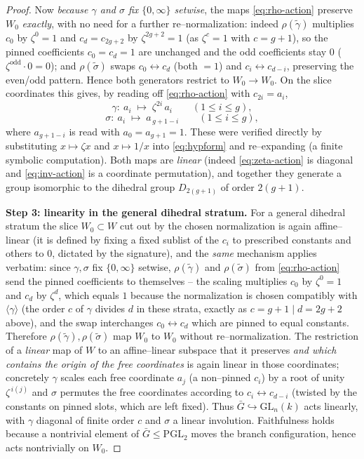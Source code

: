 \documentclass{amsart}
\theoremstyle{definition}
\begin{document}
\begin{proof}
Now \emph{because $\gamma$ and $\sigma$ fix $\{0,\infty\}$ setwise}, the maps
\eqref{eq:rho-action} preserve $W_0$ \emph{exactly}, with no need for a
further re--normalization: indeed $\rho(\widetilde\gamma)$ multiplies $c_0$ by
$\zeta^{0}=1$ and $c_{d}=c_{2g+2}$ by $\zeta^{2g+2}=1$ (as $\zeta^{c}=1$ with
$c=g+1$), so the pinned coefficients $c_0=c_{d}=1$ are unchanged and the odd
coefficients stay $0$ ($\zeta^{\text{odd}}\cdot 0=0$); and $\rho(\widetilde\sigma)$
swaps $c_0\leftrightarrow c_{d}$ (both $=1$) and $c_i\leftrightarrow c_{d-i}$,
preserving the even/odd pattern. Hence both generators restrict to
$W_0\to W_0$. On the slice coordinates this gives, by reading off \eqref{eq:rho-action} with $c_{2i}=a_i$,
\begin{equation}\label{eq:zeta-action}
 \gamma:\ a_i\;\longmapsto\;\zeta^{2i}\,a_i \qquad(1\le i\le g),
\end{equation}
\begin{equation}\label{eq:inv-action}
 \sigma:\ a_i\;\longmapsto\;a_{\,g+1-i}\qquad(1\le i\le g),
\end{equation}
where $a_{g+1-i}$ is read with $a_0=a_{g+1}=1$. These were verified directly by
substituting $x\mapsto\zeta x$ and $x\mapsto 1/x$ into \eqref{eq:hypform} and
re--expanding (a finite symbolic computation). Both maps are \emph{linear} (indeed
\eqref{eq:zeta-action} is diagonal and \eqref{eq:inv-action} is a coordinate
permutation), and together they generate a group isomorphic to the dihedral group
$D_{2(g+1)}$ of order $2(g+1)$.

\textbf{Step 3: linearity in the general dihedral stratum.}
For a general dihedral stratum the slice $W_0\subset W$ cut out by the chosen
normalization is again affine--linear (it is defined by fixing a fixed sublist of
the $c_i$ to prescribed constants and others to $0$, dictated by the signature),
and the \emph{same} mechanism applies verbatim: since $\gamma,\sigma$ fix
$\{0,\infty\}$ setwise, $\rho(\widetilde\gamma)$ and $\rho(\widetilde\sigma)$ from
\eqref{eq:rho-action} send the pinned coefficients to themselves -- the scaling
multiplies $c_0$ by $\zeta^0=1$ and $c_d$ by $\zeta^{d}$, which equals $1$ because
the normalization is chosen compatibly with $\langle\gamma\rangle$ (the order $c$
of $\gamma$ divides $d$ in these strata, exactly as $c=g+1\mid d=2g+2$ above), and
the swap interchanges $c_0\leftrightarrow c_d$ which are pinned to equal
constants. Therefore $\rho(\widetilde\gamma),\rho(\widetilde\sigma)$ map $W_0$ to
$W_0$ without re--normalization. The restriction of a \emph{linear} map of $W$ to
an affine--linear subspace that it preserves \emph{and which contains the origin
of the free coordinates} is again linear in those coordinates; concretely
$\gamma$ scales each free coordinate $a_j$ (a non--pinned $c_{i}$) by a root of
unity $\zeta^{\,i(j)}$ and $\sigma$ permutes the free coordinates according to
$c_i\leftrightarrow c_{d-i}$ (twisted by the constants on pinned slots, which are
left fixed). Thus $\bar G\hookrightarrow\mathrm{GL}_n(k)$ acts linearly, with
$\gamma$ diagonal of finite order $c$ and $\sigma$ a linear involution. Faithfulness holds because a nontrivial element of $\bar G\le\mathrm{PGL}_2$ moves
the branch configuration, hence acts nontrivially on $W_0$.


\end{proof}
\end{document}
